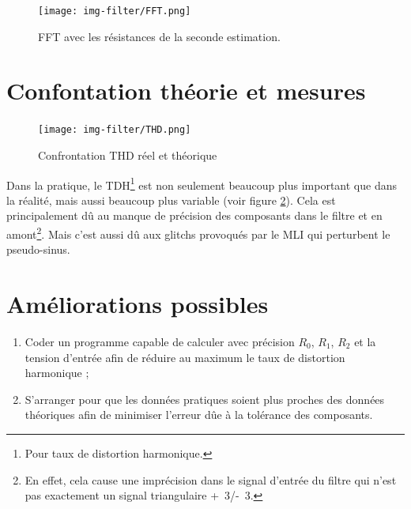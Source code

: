 \begin{figure}[ht]
	\centering
	\texttt{[image: img-filter/FFT.png]}
	\caption{FFT avec les résistances de la seconde estimation.}
	\label{fig:fft-filtre}
\end{figure}

\section{Confontation théorie et mesures}

\begin{figure}[ht]
	\centering
	\texttt{[image: img-filter/THD.png]}
	\caption{Confrontation THD réel et théorique}
	\label{fig:thd-filtre}
\end{figure}

Dans la pratique, le TDH\footnote{Pour taux de distortion harmonique.} 
est non seulement beaucoup plus important que dans la réalité, mais aussi beaucoup plus 
variable (voir figure \ref{fig:thd-filtre}). Cela est principalement dû au manque de précision des composants dans le filtre
et en amont\footnote{En effet, cela cause une imprécision dans le signal d'entrée du filtre
qui n'est pas exactement un signal triangulaire \unit{+3}{\volt}/\unit{-3}{\volt}.}. Mais c'est
aussi dû aux glitchs provoqués par le MLI qui perturbent le pseudo-sinus.

\section{Améliorations possibles}

\begin{enumerate}
	\item Coder un programme capable de calculer avec précision $R_0$, $R_1$, $R_2$ et la tension 
				d'entrée afin de réduire au maximum le taux de distortion harmonique ;
	\item S'arranger pour que les données pratiques soient plus proches des données théoriques afin 
				de minimiser l'erreur dûe à la tolérance des composants.
\end{enumerate}